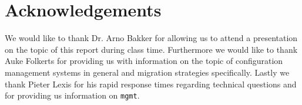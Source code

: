\section*{Acknowledgements}\label{sec:acknowledgements}
We would like to thank Dr. Arno Bakker for allowing us to attend a presentation on the topic of this report during class time. Furthermore we would like to thank Auke Folkerts for providing us with information on the topic of configuration management systems in general and migration strategies specifically. Lastly we thank Pieter Lexis for his rapid response times regarding technical questions and for providing us information on \texttt{mgmt}.
